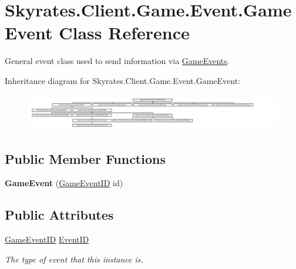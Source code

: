 \hypertarget{class_skyrates_1_1_client_1_1_game_1_1_event_1_1_game_event}{\section{Skyrates.\-Client.\-Game.\-Event.\-Game\-Event Class Reference}
\label{class_skyrates_1_1_client_1_1_game_1_1_event_1_1_game_event}
}


General event class used to send information via \hyperlink{class_skyrates_1_1_client_1_1_game_1_1_event_1_1_game_events}{Game\-Events}.  


Inheritance diagram for Skyrates.\-Client.\-Game.\-Event.\-Game\-Event\-:\begin{figure}[H]
\begin{center}
\leavevmode
\includegraphics[height=1.590909cm]{class_skyrates_1_1_client_1_1_game_1_1_event_1_1_game_event}
\end{center}
\end{figure}
\subsection*{Public Member Functions}
\begin{DoxyCompactItemize}
\item 
\hypertarget{class_skyrates_1_1_client_1_1_game_1_1_event_1_1_game_event_a1ed88bc17b45282c7d2a4de8fc729a77}{{\bfseries Game\-Event} (\hyperlink{namespace_skyrates_1_1_client_1_1_game_1_1_event_a3a7e5dc62ad299d5e53abb4a3e5d5088}{Game\-Event\-I\-D} id)}\label{class_skyrates_1_1_client_1_1_game_1_1_event_1_1_game_event_a1ed88bc17b45282c7d2a4de8fc729a77}

\end{DoxyCompactItemize}
\subsection*{Public Attributes}
\begin{DoxyCompactItemize}
\item 
\hyperlink{namespace_skyrates_1_1_client_1_1_game_1_1_event_a3a7e5dc62ad299d5e53abb4a3e5d5088}{Game\-Event\-I\-D} \hyperlink{class_skyrates_1_1_client_1_1_game_1_1_event_1_1_game_event_a193001c33b9858618141589ca39723b3}{Event\-I\-D}
\begin{DoxyCompactList}\small\item\em The type of event that this instance is. \end{DoxyCompactList}\end{DoxyCompactItemize}


